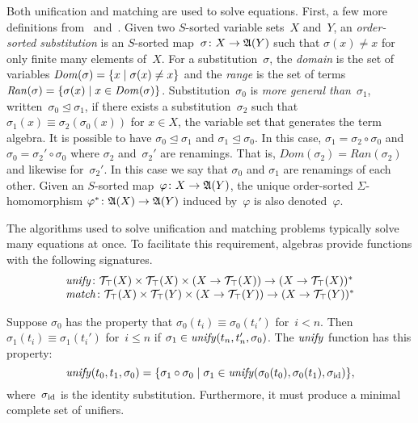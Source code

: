 \documentclass[12pt]{article}
\theoremstyle{definition}
\begin{document}
 Both unification and matching are used to solve
equations.  First, a few more definitions from~\cite{GoguenMeseguer92}
and~\cite{RobinsonVoronkov01}.  Given two $S$-sorted variable sets~$X$
and~$Y$, an \emph{order-sorted substitution} is an $S$-sorted
map~$\sigma\colon X\rightarrow\mathfrak A(Y)$ such that $\sigma(x)\neq x$
for only finite many elements of~$X$.  For a substitution~$\sigma$,
the \emph{domain} is the set of
variables $\operatorname{\mathit{Dom}}(\sigma)=\{x\mid \sigma(x)\neq x\}$ and the
\emph{range} is the set of terms
$\operatorname{\mathit{Ran}}(\sigma)=\{\sigma(x)\mid x\in\operatorname{\mathit{Dom}}(\sigma)\}$.
Substitution~$\sigma_0$ is \emph{more
  general than}~$\sigma_1$, written~$\sigma_0\unlhd\sigma_1$, if there
exists a substitution~$\sigma_2$ such that
$\sigma_1(x)\equiv\sigma_2(\sigma_0(x))$ for $x\in X$, the variable
set that generates the term algebra.  It is possible to have
$\sigma_0\unlhd\sigma_1$ and $\sigma_1\unlhd\sigma_0$.  In this case,
$\sigma_1=\sigma_2\circ\sigma_0$ and $\sigma_0=\sigma_2'\circ
\sigma_0$ where $\sigma_2$ and~$\sigma_2'$ are renamings.  That is,
$Dom(\sigma_2)=Ran(\sigma_2)$ and likewise for~$\sigma_2'$.  In this
case we say that $\sigma_0$ and $\sigma_1$ are renamings of each
other.  Given an $S$-sorted map~$\varphi\colon
X\rightarrow\mathfrak A(Y)$, the unique order-sorted
$\Sigma$-homomorphism
$\varphi^\ast\colon\mathfrak A(X)\rightarrow\mathfrak A(Y)$ induced
by~$\varphi$ is also denoted~$\varphi$.

The algorithms used to solve unification and matching problems
typically solve many equations at once.  To facilitate this
requirement, algebras provide functions with the following signatures.
$$\begin{array}{l}
\operatorname{\mathit{unify}}\colon
\mathcal{T}_\top(X)\times\mathcal{T}_\top(X)\times
(X\rightarrow\mathcal{T}_\top(X))\rightarrow
(X\rightarrow\mathcal{T}_\top(X))^\ast\\
\operatorname{\mathit{match}}\colon
\mathcal{T}_\top(X)\times\mathcal{T}_\top(Y)\times
(X\rightarrow\mathcal{T}_\top(Y))\rightarrow
(X\rightarrow\mathcal{T}_\top(Y))^\ast
\end{array}$$

Suppose $\sigma_0$ has the property that $\sigma_0(t_i)\equiv
\sigma_0(t_i')$ for~$i < n$.  Then $\sigma_1(t_i)\equiv \sigma_1(t_i')$
for~$i \leq n$ if $\sigma_1\in\operatorname{\mathit{unify}}(t_n,t'_n,\sigma_0)$.  The
$\operatorname{\mathit{unify}}$ function has this property:
$$\operatorname{\mathit{unify}}(t_0,t_1,\sigma_0)=\{{\mathord{\sigma_1}}\circ{\mathord{\sigma_0}}\mid
\sigma_1\in\operatorname{\mathit{unify}}(\sigma_0(t_0),\sigma_0(t_1),\sigma_{\mathrm{id}})\},$$
where~$\sigma_{\mathrm{id}}$ is the identity substitution.  Furthermore, it must
produce a minimal complete set of unifiers.
\end{document}
